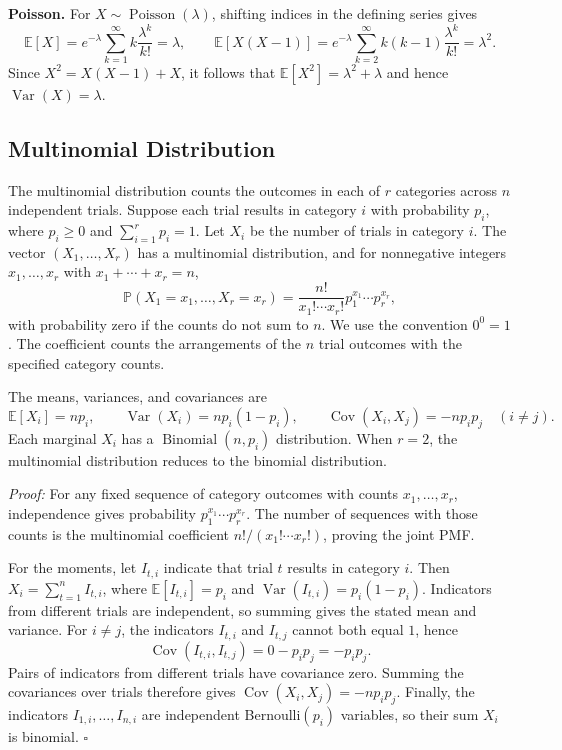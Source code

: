 \documentclass[a4paper,11pt,abstracton]{scrartcl}
\theoremstyle{dotlessP}
\theoremstyle{dotlessS}
\theoremstyle{remark}
\theoremstyle{definition}
\begin{document}
\begin{claim_box}
\textbf{Poisson.} For $X\sim\operatorname{Poisson}(\lambda)$, shifting indices in the defining series gives
\[
  \mathbb{E}[X]=e^{-\lambda}\sum_{k=1}^{\infty}k\frac{\lambda^k}{k!}=\lambda,
  \qquad
  \mathbb{E}[X(X-1)]=e^{-\lambda}\sum_{k=2}^{\infty}k(k-1)\frac{\lambda^k}{k!}=\lambda^2.
\]
Since $X^2=X(X-1)+X$, it follows that $\mathbb{E}[X^2]=\lambda^2+\lambda$ and hence $\operatorname{Var}(X)=\lambda$.
\end{claim_box}

\subsection{Multinomial Distribution}

The multinomial distribution counts the outcomes in each of $r$ categories across $n$ independent trials. Suppose each trial results in category $i$ with probability $p_i$, where $p_i\geq0$ and $\sum_{i=1}^{r}p_i=1$. Let $X_i$ be the number of trials in category $i$. The vector $(X_1,\ldots,X_r)$ has a multinomial distribution, and for nonnegative integers $x_1,\ldots,x_r$ with $x_1+\cdots+x_r=n$,
\[
  \mathbb{P}(X_1=x_1,\ldots,X_r=x_r)
  =\frac{n!}{x_1!\cdots x_r!}p_1^{x_1}\cdots p_r^{x_r},
\]
with probability zero if the counts do not sum to $n$. We use the convention $0^0=1$. The coefficient counts the arrangements of the $n$ trial outcomes with the specified category counts.

The means, variances, and covariances are
\[
  \mathbb{E}[X_i]=np_i,\qquad
  \operatorname{Var}(X_i)=np_i(1-p_i),\qquad
  \operatorname{Cov}(X_i,X_j)=-np_ip_j\quad(i\ne j).
\]
Each marginal $X_i$ has a $\operatorname{Binomial}(n,p_i)$ distribution. When $r=2$, the multinomial distribution reduces to the binomial distribution.

\begin{claim_box}
\textit{Proof:} For any fixed sequence of category outcomes with counts $x_1,\ldots,x_r$, independence gives probability $p_1^{x_1}\cdots p_r^{x_r}$. The number of sequences with those counts is the multinomial coefficient $n!/(x_1!\cdots x_r!)$, proving the joint PMF.

For the moments, let $I_{t,i}$ indicate that trial $t$ results in category $i$. Then $X_i=\sum_{t=1}^n I_{t,i}$, where $\mathbb{E}[I_{t,i}]=p_i$ and $\operatorname{Var}(I_{t,i})=p_i(1-p_i)$. Indicators from different trials are independent, so summing gives the stated mean and variance. For $i\ne j$, the indicators $I_{t,i}$ and $I_{t,j}$ cannot both equal $1$, hence
\[
  \operatorname{Cov}(I_{t,i},I_{t,j})=0-p_ip_j=-p_ip_j.
\]
Pairs of indicators from different trials have covariance zero. Summing the covariances over trials therefore gives $\operatorname{Cov}(X_i,X_j)=-np_ip_j$. Finally, the indicators $I_{1,i},\ldots,I_{n,i}$ are independent Bernoulli$(p_i)$ variables, so their sum $X_i$ is binomial.
\hfill$\square$
\end{claim_box}
\end{document}
